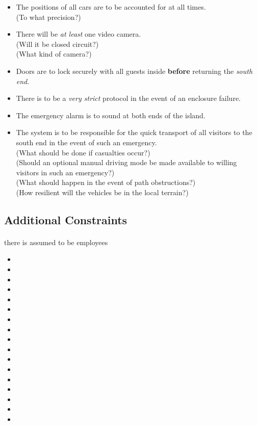 \documentclass[12pt]{article}
\begin{document}
\begin{itemize}
		\item The positions of all cars are to be accounted for at all times. 
		\\(To what precision?)
		\item There will be \textit{at least} one video camera. 
		\\(Will it be closed circuit?) 
		\\(What kind of camera?)
		\item Doors are to lock securely with all guests inside \textbf{before} returning the \textit{south end}.
		\item There is to be a \textit{very strict} protocol in the event of an enclosure failure.
		\item The emergency alarm is to sound at both ends of the island.
		\item The system is to be responsible for the quick transport of all visitors to the south end in the event of such an emergency.
		\\(What should be done if casualties occur?)
		\\(Should an optional manual driving mode be made available to willing visitors in such an emergency?)
		\\(What should happen in the event of path obstructions?)
		\\(How resilient will the vehicles be in the local terrain?) 
	\end{itemize}
	\subsection{Additional Constraints}
	\paragraph{} there is assumed to be employees
	\begin{itemize}
		\item[]
		\item[]
		\item[]
		\item[]
		\item[]
		\item[]
		\item[]
		\item[]
		\item[]
		\item[]
		\item[]
		\item[]
		\item[]
		\item[]
		\item[]
		\item[]
		\item[] 
	\end{itemize}
\end{document}
